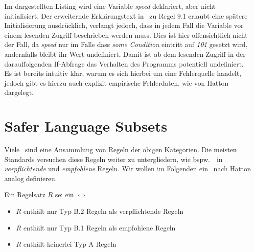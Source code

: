 \documentclass[a4paper,UKenglish,cleveref, autoref]{templates/lipics-v2019}
\begin{document}
    \noindent
    \begin{minipage}{\linewidth}
        \begin{example}
            
        \end{example}
    \end{minipage}

    Im dargestellten Listing wird eine Variable \textit{speed} deklariert, aber nicht initialisiert.
    Der erweiternde Erklärungstext in~\cite{MISRA2004} zu Regel 9.1 erlaubt eine spätere Initialisierung ausdrücklich, verlangt jedoch, dass
    in jedem Fall die Variable vor einem lesenden Zugriff beschrieben werden muss.
    Dies ist hier offensichtlich nicht der Fall, da \textit{speed} nur im Falle dass \textit{some Condition} eintritt auf
    \textit{101} gesetzt wird, andernfalls bleibt ihr Wert undefiniert.
    Damit ist ab dem lesenden Zugriff in der darauffolgenden If-Abfrage das Verhalten des Programms potentiell undefiniert.
    Es ist bereits intuitiv klar, warum es sich hierbei um eine Fehlerquelle handelt, jedoch gibt es hierzu auch explizit
    empirische Fehlerdaten, wie von Hatton dargelegt.\cite{hatton2004safer}

    \section{Safer Language Subsets}
    \label{sec:safer-language-subsets}

    Viele \sqss\ sind eine Ansammlung von Regeln der obigen Kategorien.
    Die meisten Standards versuchen diese Regeln weiter zu untergliedern, wie bspw.\ \misra\ in \textit{verpflichtende}
    und \textit{empfohlene} Regeln.
    Wir wollen im Folgenden ein \sls\ nach Hatton analog definieren.

    \begin{definition}
        Ein Regelsatz $R$ sei ein \sls $\iff$
        \begin{itemize}
            \item $R$ enthält nur Typ B.2 Regeln als verpflichtende Regeln
            \item $R$ enthält nur Typ B.1 Regeln als empfohlene Regeln
            \item $R$ enthält keinerlei Typ A Regeln
        \end{itemize}
    \end{definition}
\end{document}
